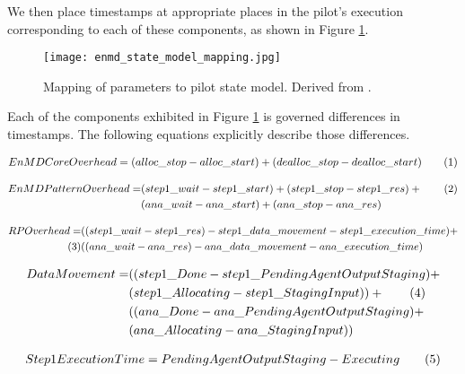 \documentclass[]{article}
\newcommand\numberthis{\addtocounter{equation}{1}\tag{\theequation}}
\begin{document}
			We then place timestamps at appropriate places in the pilot's execution corresponding to each of these components, as shown in Figure \ref{fig:param_pilot_state_mapping}.

			\begin{figure}[H]
				\centering
				\texttt{[image: enmd\_state\_model\_mapping.jpg]}
				\caption{Mapping of parameters to pilot state model. Derived from \cite{rp_state_diagram}.}
				\label{fig:param_pilot_state_mapping}
			\end{figure}


			Each of the components exhibited in Figure \ref{fig:param_pilot_state_mapping} is governed differences in timestamps. The following equations explicitly describe those differences.

			\begin{align*}
				EnMD Core Overhead = (alloc\_stop - alloc\_start) + (dealloc\_stop - dealloc\_start) \numberthis \label{1}
			\end{align*}

			\begin{align*}
				EnMD Pattern Overhead = &(step1\_wait-step1\_start) + (step1\_stop - step1\_res) + \numberthis \label{2} \\
										&(ana\_wait-ana\_start) + (ana\_stop - ana\_res) 
			\end{align*}

			\begin{align*}
				RP Overhead = &((step1\_wait - step1\_res) - step1\_data\_movement - step1\_execution\_time) + \\ \numberthis \label{3} 
							  &((ana\_wait - ana\_res) - ana\_data\_movement - ana\_execution\_time) 
			\end{align*}

			\begin{align*}
				Data Movement = &((step1\_Done - step1\_PendingAgentOutputStaging) + \\
								&(step1\_Allocating - step1\_StagingInput)) + \numberthis \label{4} \\
								&((ana\_Done - ana\_PendingAgentOutputStaging) + \\
								&(ana\_Allocating - ana\_StagingInput)) 
			\end{align*}
			
			\begin{align*}
				Step 1 Execution Time = PendingAgentOutputStaging - Executing \numberthis \label{5}
			\end{align*}
\end{document}
